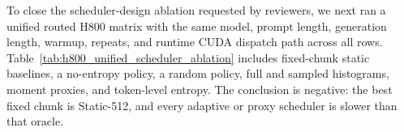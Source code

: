 \begin{table}[h]
\centering
\caption{H800 static-oracle versus adaptive routed comparison (Mamba-370M, prompt length 976, 32 new tokens, $n{=}50$, warmup$=3$). The confirm run repeats only chunk~128, chunk~1024, and adaptive sampled histogram.}
\label{tab:h800_static_oracle_adaptive}
\small
{}
\end{table}

To close the scheduler-design ablation requested by reviewers, we next ran a unified routed H800 matrix with the same model, prompt length, generation length, warmup, repeats, and runtime CUDA dispatch path across all rows. Table~\ref{tab:h800_unified_scheduler_ablation} includes fixed-chunk static baselines, a no-entropy policy, a random policy, full and sampled histograms, moment proxies, and token-level entropy. The conclusion is negative: the best fixed chunk is Static-512, and every adaptive or proxy scheduler is slower than that oracle.


